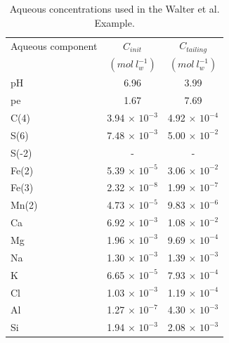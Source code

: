 \begin{table}
\caption{Aqueous concentrations used in the Walter et al. Example.}
\begin{center}
\begin{tabular}{l c c}
\hline
Aqueous  component        & $C_{init}$ & $C_{tailing}$      \\
                  & $(mol\ l^{-1}_w)$   & $(mol\ l^{-1}_w)$      \\ \hline
pH             &   6.96    &  3.99           \\
pe              &   1.67    &  7.69           \\
C(4)            &  3.94 $\times$ $10^{-3}$ & 4.92 $\times$ $10^{-4}$  \\
S(6)            &  7.48 $\times$ $10^{-3}$ & 5.00 $\times$ $10^{-2}$  \\
S(-2)           &     -             &     -              \\
Fe(2)           &  5.39 $\times$ $10^{-5}$ & 3.06 $\times$ $10^{-2}$   \\
Fe(3)           &  2.32 $\times$ $10^{-8}$ & 1.99 $\times$ $10^{-7}$   \\
Mn(2)           &  4.73 $\times$ $10^{-5}$ & 9.83 $\times$ $10^{-6}$   \\
Ca              &  6.92 $\times$ $10^{-3}$ & 1.08 $\times$ $10^{-2}$   \\
Mg              &  1.96 $\times$ $10^{-3}$ & 9.69 $\times$ $10^{-4}$   \\
Na              &  1.30 $\times$ $10^{-3}$ & 1.39 $\times$ $10^{-3}$   \\
K               &  6.65 $\times$ $10^{-5}$ & 7.93 $\times$ $10^{-4}$   \\
Cl              &  1.03 $\times$ $10^{-3}$ & 1.19 $\times$ $10^{-4}$   \\
Al              &  1.27 $\times$ $10^{-7}$ & 4.30 $\times$ $10^{-3}$   \\
Si              &  1.94 $\times$ $10^{-3}$ & 2.08 $\times$ $10^{-3}$   \\ \hline
\end{tabular}
\label{ex3_caqu}
\end{center}
\end{table}

